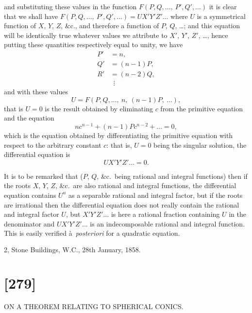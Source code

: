 \documentclass[12pt,a4paper]{article}
\theoremstyle{definition}
\begin{document}
and substituting these values in the function $F(P, Q, \ldots,\ P', Q', \ldots)$ it is clear that we
shall have $F(P, Q, \ldots,\ P', Q', \ldots) = UX'Y'Z'\ldots$ where $U$ is a symmetrical function of
$X$, $Y$, $Z$, \&c., and therefore a function of $P$, $Q$, \ldots; and this equation will be identically
true whatever values we attribute to $X'$, $Y'$, $Z'$, \ldots, hence putting these quantities
respectively equal to unity, we have
\begin{align*}
P' &= n,\\
Q' &= (n - 1)P,\\
R' &= (n - 2)Q,\\
&\ \;\vdots
\end{align*}
and with these values
\[
U = F(P, Q, \ldots,\ n,\ (n - 1)P,\ \ldots),
\]
that is $U = 0$ is the result obtained by eliminating $c$ from the primitive equation and
the equation
\[
nc^{n-1} + (n - 1)Pc^{n-2} + \ldots = 0,
\]
which is the equation obtained by differentiating the primitive equation with respect to
the arbitrary constant $c$: that is, $U = 0$ being the singular solution, the differential
equation is
\[
UX'Y'Z'\ldots = 0.
\]

It is to be remarked that ($P$, $Q$, \&c.\ being rational and integral functions) then
if the roots $X$, $Y$, $Z$, \&c.\ are also rational and integral functions, the differential
equation contains $U^{n}$ as a separable rational and integral factor, but if the roots are
irrational then the differential equation does not really contain the rational and integral
factor $U$, but $X'Y'Z'\ldots$ is here a rational fraction containing $U$ in the denominator
and $UX'Y'Z'\ldots$ is an indecomposable rational and integral function. This is easily
verified \`a~\textit{posteriori} for a quadratic equation.

\begin{flushright}
2, Stone Buildings, W.C., 28th January, 1858.
\end{flushright}


\newpage
\section*{[279]}
\begin{center}
{\large ON A THEOREM RELATING TO SPHERICAL CONICS.}
\end{center}
\end{document}
